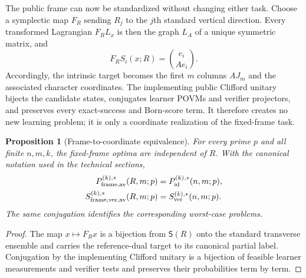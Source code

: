 \documentclass[11pt]{article}
\newcommand{\1}{\mathbf 1}
\theoremstyle{plain}
\newtheorem{proposition}[theorem]{Proposition}
\theoremstyle{definition}
\theoremstyle{remark}
\begin{document}
The public frame can now be standardized without changing either task.  Choose
a symplectic map $F_R$ sending $R_j$ to the $j$th standard vertical direction.
Every transformed Lagrangian $F_RL_x$ is then the graph $L_A$ of a unique
symmetric matrix, and
\begin{equation}
 F_RS_i(x;R)=\binom{e_i}{Ae_i}.
 \label{eq:dual-family-normal-form-coordinate}
\end{equation}
Accordingly, the intrinsic target becomes the first $m$ columns $AJ_m$ and the
associated character coordinates.  The implementing public Clifford unitary
bijects the candidate states, conjugates learner POVMs and verifier projectors,
and preserves every exact-success and Born-score term.  It therefore creates
no new learning problem; it is only a coordinate realization of the fixed-frame
task.

\begin{proposition}[Frame-to-coordinate equivalence]
\label{prop:frame-conditioned-coordinate-reduction}
For every prime $p$ and all finite $n,m,k$, the fixed-frame optima are
independent of $R$.  With the canonical notation used in the technical
sections,
\begin{align}
 P_{\rm frame,av}^{(k),*}(R,m;p)&=P_{\mathrm{id}}^{(k),*}(n,m;p),
 \label{eq:finite-frame-coordinate-equivalence}\\
 S_{\rm frame,ver,av}^{(k),*}(R,m;p)&=S_{\mathrm{ver}}^{(k),*}(n,m;p).
 \label{eq:finite-frame-verification-equivalence}
\end{align}
The same conjugation identifies the corresponding worst-case problems.
\end{proposition}
\begin{proof}
The map $x\mapsto F_Rx$ is a bijection from $\mathsf S(R)$ onto the standard
transverse ensemble and carries the reference-dual target to its canonical
partial label.  Conjugation by the implementing Clifford unitary is a
bijection of feasible learner measurements and verifier tests and preserves
their probabilities term by term.
\end{proof}
\end{document}
